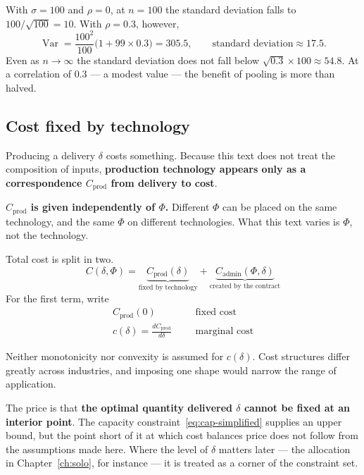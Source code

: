 \begin{example}
With $\sigma=100$ and $\rho=0$, at $n=100$ the standard deviation falls to
$100/\sqrt{100}=10$. With $\rho=0.3$, however,
\[
\operatorname{Var}=\frac{100^2}{100}\bigl(1+99\times 0.3\bigr)=305.5,\qquad
\text{standard deviation}\approx 17.5 .
\]
Even as $n\to\infty$ the standard deviation does not fall below
$\sqrt{0.3}\times 100 \approx 54.8$.
At a correlation of $0.3$ --- a modest value --- the benefit of pooling is more than halved.
\end{example}

\subsection{Cost fixed by technology}
\label{sec:production}

Producing a delivery $\delta$ costs something. Because this text does not treat the
composition of inputs, \textbf{production technology appears only as a correspondence
$C_{\mathrm{prod}}$ from delivery to cost}.

\textbf{$C_{\mathrm{prod}}$ is given independently of $\Phi$.} Different $\Phi$ can be
placed on the same technology, and the same $\Phi$ on different technologies. What this
text varies is $\Phi$, not the technology.

\begin{definition}
\label{def:cost}
Total cost is split in two.
\begin{equation}
C(\delta,\Phi) = \underbrace{C_{\mathrm{prod}}(\delta)}_{\text{fixed by technology}}
 + \underbrace{C_{\mathrm{admin}}(\Phi,\delta)}_{\text{created by the contract}}
\label{eq:cost-split}
\end{equation}
For the first term, write
\begin{align}
C_{\mathrm{prod}}(0) && &\text{fixed cost} \\
c(\delta) = \frac{dC_{\mathrm{prod}}}{d\delta} && &\text{marginal cost}
\end{align}
\end{definition}

\begin{remark}
Neither monotonicity nor convexity is assumed for $c(\delta)$. Cost structures differ
greatly across industries, and imposing one shape would narrow the range of application.

The price is that \textbf{the optimal quantity delivered $\delta$ cannot be fixed at an
interior point}. The capacity constraint~\eqref{eq:cap-simplified} supplies an upper bound,
but the point short of it at which cost balances price does not follow from the assumptions
made here. Where the level of $\delta$ matters later --- the allocation in
Chapter~\ref{ch:solo}, for instance --- it is treated as a corner of the constraint set.
\end{remark}

